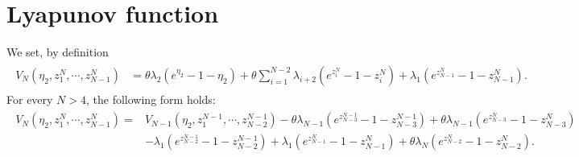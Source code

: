 \documentclass[10pt, a4paper]{amsart}
\theoremstyle{plain}
\theoremstyle{definition}
\theoremstyle{remark}
\numberwithin{equation}{section}
\begin{document}
\section*{Lyapunov function} %
We set, by definition
\begin{align}
\begin{aligned}
V_N(\eta_2,z^N_1,\cdots,z^N_{N-1})&= \theta \lambda_2(e^{\eta_{2}}-1-\eta_{2})+\theta \sum_{i=1}^{N-2}\lambda_{i+2}(e^{z^N_{i}}-1-z^N_{i})+\lambda_1(e^{z^N_{N-1}}-1-z^N_{N-1}).
\end{aligned}
\end{align}
For every $N>4$, the following form holds: 
\begin{align}
\begin{aligned}
V_N(\eta_2,z^{N}_1,\cdots,z^{N}_{N-1})=&V_{N-1}(\eta_2,z^{N-1}_1,\cdots,z^{N-1}_{N-2})-\theta\lambda_{N-1}(e^{z^{N-1}_{N-3}}-1-z^{N-1}_{N-3})+\theta\lambda_{N-1}(e^{z^{N}_{N-3}}-1-z^{N}_{N-3})\\
&-\lambda_{1}(e^{z^{N-1}_{N-2}}-1-z^{N-1}_{N-2})+\lambda_{1}(e^{z^{N}_{N-1}}-1-z^{N}_{N-1})+\theta\lambda_{N}(e^{z^{N}_{N-2}}-1-z^{N}_{N-2}).
\end{aligned}
\end{align}
\end{document}
